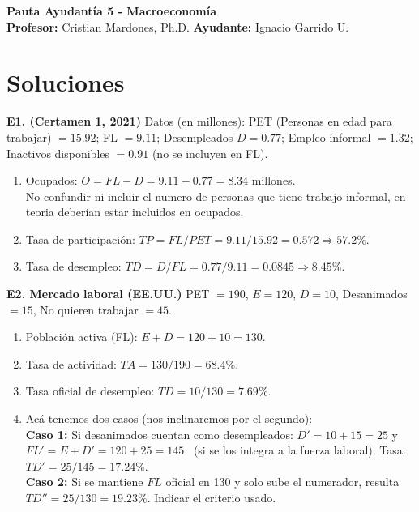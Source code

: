 \documentclass[11pt,addpoints]{article}
\begin{document}
\vspace*{0.01cm}

\begin{center}
{\Large \bfseries Pauta Ayudantía 5 - Macroeconomía \\[0.5cm]}
\textbf{Profesor:} Cristian Mardones, Ph.D. \quad \textbf{Ayudante:} Ignacio Garrido U.
\end{center}



\section*{\textbf{Soluciones}}

\textbf{E1. (Certamen 1, 2021)} \quad Datos (en millones): PET (Personas en edad para trabajar) $=15.92$; FL $=9.11$; Desempleados $D=0.77$; Empleo informal $=1.32$; Inactivos disponibles $=0.91$ (no se incluyen en FL).
\begin{enumerate}[label=\alph*)]
\item Ocupados: $O=FL-D=9.11-0.77=8.34$ millones. \\
No confundir ni incluir el numero de personas que tiene trabajo informal, en teoria deberían estar incluidos en ocupados.
\item Tasa de participación: $TP=FL/PET=9.11/15.92=0.572\Rightarrow \mathbf{57.2\%}$.
\item Tasa de desempleo: $TD=D/FL=0.77/9.11=0.0845\Rightarrow \mathbf{8.45\%}$.
\end{enumerate}

\bigskip
\textbf{E2. Mercado laboral (EE.UU.)} \quad PET $=190$, $E=120$, $D=10$, Desanimados $=15$, No quieren trabajar $=45$.
\begin{enumerate}[label=\alph*)]
\item Población activa (FL): $E+D=120+10=130$.
\item Tasa de actividad: $TA=130/190=68.4\%$.
\item Tasa oficial de desempleo: $TD=10/130=7.69\%$.
\item Acá tenemos dos casos (nos inclinaremos por el segundo):\\
\textbf{Caso 1:} Si desanimados cuentan como desempleados: $D'=10+15=25$ y $FL'=E+D'=120+25=145$ \ (si se los integra a la fuerza laboral). Tasa: $TD'=25/145=17.24\%$. \\
\textbf{Caso 2:} Si se mantiene $FL$ oficial en 130 y solo sube el numerador, resulta $TD''=25/130=19.23\%$. Indicar el criterio usado.
\end{enumerate}
\end{document}
